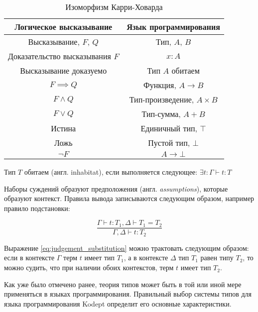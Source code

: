 \begin{table}[H]
    \centering
    \caption{Изоморфизм Карри-Ховарда}
    \label{tab:curry-hovard-iso}
    \begin{tabular}{|c|c|}
        \hline
        \textbf{Логическое высказывание} & \textbf{Язык программирования} \\\hline
        Высказывание, $F$, $Q$           & Тип, $A$, $B$                  \\\hline
        Доказательство высказывания $F$  & $x: A$                         \\\hline
        Высказывание доказуемо           & Тип $A$ обитаем                \\\hline
        $F \implies Q$                   & Функция, $A \to B$             \\\hline
        $F \wedge Q$                     & Тип-произведение, $A \times B$ \\\hline
        $F \vee Q$                       & Тип-сумма, $A + B$             \\\hline
        Истина                           & Единичный тип, $\top$          \\\hline
        Ложь                             & Пустой тип, $\bot$             \\\hline
        $\neg F$                         & $A \to \bot$                   \\\hline
    \end{tabular}
\end{table}

Тип $T$ обитаем (англ. inhabitat), если выполняется следующее: $\exists t: \Gamma \vdash t: T$

Наборы суждений образуют предположения (англ. \textit{assumptions}), которые образуют контекст.
Правила вывода записываются следующим образом, например правило подстановки:

\begin{equation}
    \label{eq:judgement_substitution}
    \frac{\Gamma \vdash t: T_1, \Delta \vdash T_1 = T_2}{\Gamma, \Delta \vdash t: T_2}
\end{equation}

Выражение \ref{eq:judgement_substitution} можно трактовать следующим образом: если в контексте $\Gamma$ терм $t$ имеет тип $T_1$, а в контексте $\Delta$ тип $T_1$ равен типу $T_2$, то можно судить, что при наличии обоих контекстов, терм $t$ имеет тип $T_2$.

Как уже было отмечено ранее, теория типов может быть в той или иной мере применяться в языках программирования.
Правильный выбор системы типов для языка программирования Kodept определит его основные характеристики.


